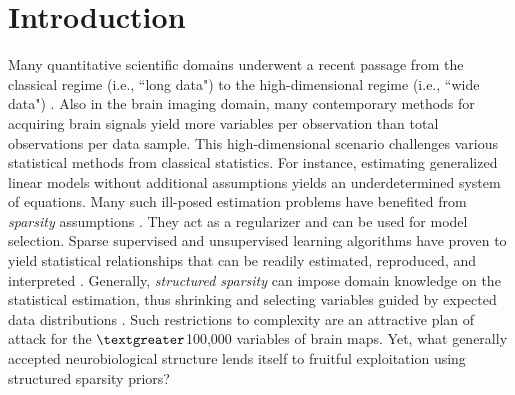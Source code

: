 \documentclass{article} %
\begin{document}
\section{Introduction}
Many quantitative scientific domains underwent a
recent passage from the classical regime (i.e., ``long data")  to
the high-dimensional regime (i.e., ``wide data")
\cite{jordan2015massive}.
Also in the brain imaging domain,
many contemporary methods for acquiring brain signals yield
more variables per observation than
total observations per data sample.
This high-dimensional scenario challenges various statistical methods from
classical statistics.
For instance,
estimating generalized linear models without additional assumptions
yields an underdetermined system of equations.
%
Many such ill-posed estimation problems
have benefited from
\textit{sparsity} assumptions
\cite{buhlmann2011statistics, hastie2015statistical}.
They act as a 
regularizer and can be used for model selection.
Sparse supervised and unsupervised
learning algorithms have proven to yield
statistical relationships that can be readily
estimated, reproduced, and interpreted
\cite{giraud2014introduction}.
%
Generally, \textit{structured sparsity} can impose
domain knowledge on the 
statistical estimation,
thus shrinking and selecting variables guided by
expected data distributions
\cite{bach2012optimization}.
Such restrictions to complexity are an attractive plan of attack
for the $\textgreater$100,000 variables of brain maps.
Yet, what generally accepted neurobiological structure lends itself
to fruitful exploitation using structured sparsity priors?
\end{document}
